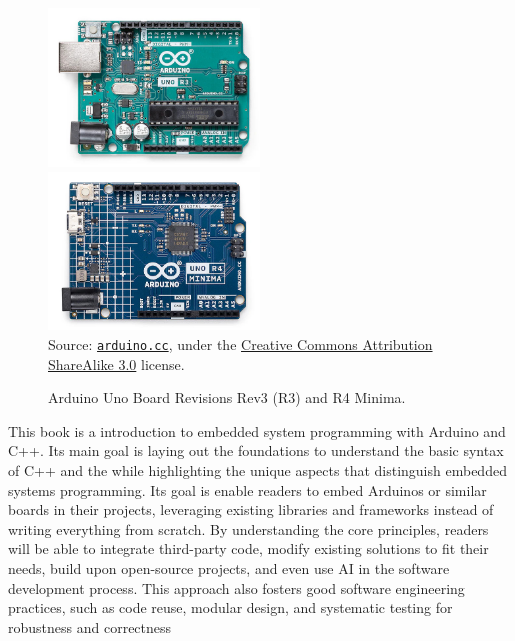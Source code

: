 \begin{figure}[t]
    \includegraphics[width=0.5\textwidth]{img/arduino_uno_rev3}%
    \includegraphics[width=0.5\textwidth]{img/arduino_uno_rev4}%
    \\ \scriptsize
    Source: \href{https://store.arduino.cc/collections/edu-boards}{\texttt{arduino.cc}}, under the \href{https://creativecommons.org/licenses/by-sa/3.0/legalcode}{Creative Commons Attribution ShareAlike 3.0} license.
    \caption{Arduino Uno Board Revisions Rev3 (R3) and R4 Minima.}
    \label{fig:arduino_uno}
\end{figure}

This book is a introduction to embedded system programming with Arduino and C++.
Its main goal is laying out the foundations to understand the basic syntax of C++ and the while highlighting the unique aspects that distinguish embedded systems programming.
Its goal is enable readers to embed Arduinos or similar boards in their projects, leveraging existing libraries and frameworks instead of writing everything from scratch.
By understanding the core principles, readers will be able to integrate third-party code, modify existing solutions to fit their needs, build upon open-source projects, and even use AI in the software development process.
This approach also fosters good software engineering practices, such as code reuse, modular design, and systematic testing for robustness and correctness


